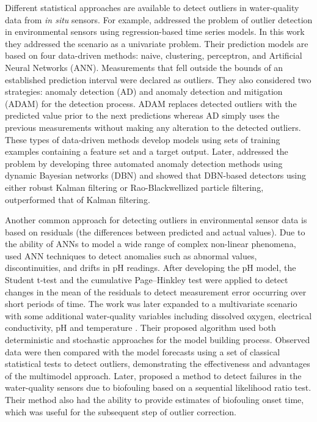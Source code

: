 \documentclass[draft]{agujournal2018} %
\begin{document}
Different statistical approaches are available to detect outliers in
water-quality data from \emph{in situ} sensors. For example,
\citet{hill2006automated} addressed the problem of outlier detection
in environmental sensors using regression-based time series models. In
this work they addressed the scenario as a univariate problem. Their
prediction models are based on four data-driven methods: naive,
clustering, perceptron, and Artificial Neural Networks (ANN).
Measurements that fell outside the bounds of an established prediction
interval were declared as outliers. They also considered two strategies:
anomaly detection (AD) and anomaly detection and mitigation (ADAM) for
the detection process. ADAM replaces detected outliers with the
predicted value prior to the next predictions whereas AD simply uses the
previous measurements without making any alteration to the detected
outliers. These types of data-driven methods develop models using sets
of training examples containing a feature set and a target output.
Later, \citet{hill2009real} addressed the problem by developing three
automated anomaly detection methods using dynamic Bayesian networks
(DBN) and showed that DBN-based detectors using either robust Kalman
filtering or Rao-Blackwellized particle filtering, outperformed that of
Kalman filtering.

Another common approach for detecting outliers in environmental sensor
data is based on residuals (the differences between predicted and actual
values). Due to the ability of ANNs to model a wide range of complex
non-linear phenomena, \citet{moatar1999ph} used ANN techniques to
detect anomalies such as abnormal values, discontinuities, and drifts in
pH readings. After developing the pH model, the Student t-test and the
cumulative Page--Hinkley test were applied to detect changes in the mean
of the residuals to detect measurement error occurring over short
periods of time. The work was later expanded to a
multivariate scenario with some additional water-quality variables
including dissolved oxygen, electrical conductivity, pH and temperature  \citep{moatar2001quality}. Their proposed algorithm used both deterministic and stochastic approaches for the model building process. Observed data were then compared with the model forecasts using a set of classical statistical
tests to detect outliers, demonstrating the
effectiveness and advantages of the multimodel approach. Later,
\citet{archer2003fault} proposed a method to detect failures in the
water-quality sensors due to biofouling based on a sequential likelihood
ratio test. Their method also had the ability to provide estimates of
biofouling onset time, which was useful for the subsequent step of
outlier correction.
\end{document}
